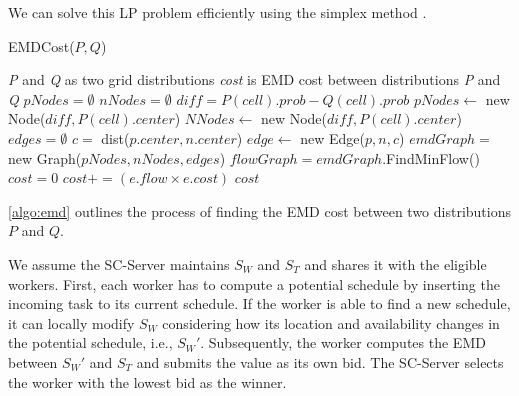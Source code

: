\noindent We can solve this LP problem efficiently using the simplex method \cite{Dantzig90}.

\begin{algorithm}[h]
\caption{EMDCost($P, Q$)}
\label{algo:emd}
\begin{algorithmic}[1]
\REQUIRE \emph{P} and \emph{Q} as two grid distributions
\ENSURE \emph{cost} is EMD cost between distributions \emph{P} and \emph{Q}
\STATE $pNodes = \emptyset$
\STATE $nNodes = \emptyset$
	\STATE $diff = P(cell).prob - Q(cell).prob$
		\STATE $pNodes \leftarrow$ new Node($diff, P(cell).center$)
	\ELSE
		\STATE $NNodes \leftarrow$ new Node($diff, P(cell).center$)
	\ENDIF
\ENDFOR
\STATE $edges = \emptyset$
		\STATE $c =$ dist($p.center, n.center$)
		\STATE $edge \leftarrow$ new Edge($p, n, c$)
	\ENDFOR
\ENDFOR
\STATE $emdGraph =$ new Graph($pNodes, nNodes, edges$)
\STATE $flowGraph = emdGraph$.FindMinFlow()
\STATE $cost = 0$
	\STATE $cost += (e.flow \times e.cost)$
\ENDFOR
\RETURN $cost$
\end{algorithmic}
\end{algorithm}

\cref{algo:emd} outlines the process of finding the EMD cost between two distributions $P$ and $Q$. 

We assume the SC-Server maintains $S_W$ and $S_T$ and shares it with the eligible workers. First, each worker has to compute a potential schedule by inserting the incoming task to its current schedule. If the worker is able to find a new schedule, it can locally modify $S_W$ considering how its location and availability changes in the potential schedule, i.e., $S_{W}'$. Subsequently, the worker computes the EMD between $S_{W}'$ and $S_T$ and submits the value as its own bid. The SC-Server selects the worker with the lowest bid as the winner.



